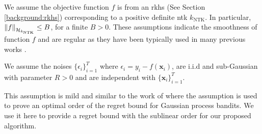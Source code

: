 \begin{assumption}
    We assume the objective function $f$ is from an \ac{rkhs} (See Section \ref{background:rkhs}) corresponding to a positive definite \ac{ntk}  $k_\text{NTK}$. In particular, $\norm{f}_{\mathcal{H}_{k_\text{NTK}}} \leq B$, for a finite $B > 0$. These assumptions indicate the smoothness of function $f$ and are regular as they have been typically used in many previous works \citep{chowdhury2017kernelized, srinivas2009gaussian,vakili2021information}.
\end{assumption}
\begin{assumption}
\label{assumption:iid_noise}
We assume the noises $\{\epsilon_i\}_{i=1}^T$ where $\epsilon_i = y_i - f(\mathbf{x}_i)$, are i.i.d and sub-Gaussian with parameter $R > 0$ and are independent with $\{\mathbf{x}_i\}_{i=1}^T$. 
\end{assumption} 
This assumption is mild and similar to the work of \citet{vakili2021optimal} where the assumption is used to prove an optimal order of the regret bound for Gaussian process bandits. We use it here to provide a regret bound with the sublinear order for our proposed algorithm.    


